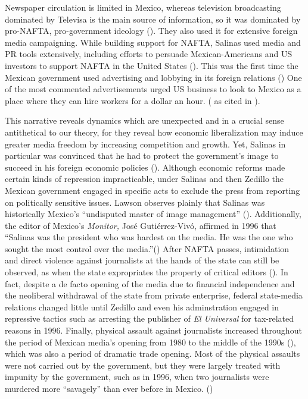 \documentclass[12pt]{report}
\begin{document}
Newspaper circulation is limited in Mexico, whereas television broadcasting
dominated by Televisa is the main source of information, so it was
dominated by pro-NAFTA, pro-government ideology (\citealt{Hellman:1993wa}).
They also used it for extensive foreign media campaigning. While building
support for NAFTA, Salinas used media and PR tools extensively, including
efforts to persuade Mexican-Americans and US investors to support
NAFTA in the United States (\citealt{Morris:2001iy}). This was the
first time the Mexican government used advertising and lobbying in
its foreign relations (\citealt{Chabat:1997wj}) One of the most commented
advertisements urged US business to look to Mexico as a place where
they can hire workers for a dollar an hour. (\citealt[105]{center1993trading}
as cited in \citealt[45]{Chabat:1997wj}).

This narrative reveals dynamics which are unexpected and in a crucial
sense antithetical to our theory, for they reveal how economic liberalization
may induce greater media freedom by increasing competition and growth.
Yet, Salinas in particular was convinced that he had to protect the
government's image to succeed in his foreign economic policies (\citealt[107]{Dominguez:2009wd}).
Although economic reforms made certain kinds of repression impracticable,
under Salinas and then Zedillo the Mexican government engaged in specific
acts to exclude the press from reporting on politically sensitive
issues. Lawson observes plainly that Salinas was historically Mexico's
``undisputed master of image management'' (\citealt[39]{lawson2002building}).
Additionally, the editor of Mexico's \emph{Monitor, }José Gutiérrez-Vivó,
affirmed in 1996 that ``Salinas was the president who was hardest
on the media. He was the one who sought the most control over the
media.''(\citealt[39]{lawson2002building}) After NAFTA passes, intimidation
and direct violence against journalists at the hands of the state
can still be observed, as when the state expropriates the property
of critical editors (\citealt{OrmeJr:1997da}). In fact, despite a
de facto opening of the media due to financial independence and the
neoliberal withdrawal of the state from private enterprise, federal
state-media relations changed little until Zedillo and even his adminstration
engaged in repressive tactics such as arresting the publisher of \emph{El
Universal} for tax-related reasons in 1996. Finally, physical assault
against journalists increased throughout the period of Mexican media's
opening from 1980 to the middle of the 1990s (\citealt[81]{lawson2002building}),
which was also a period of dramatic trade opening. Most of the physical
assaults were not carried out by the government, but they were largely
treated with impunity by the government, such as in 1996, when two
journalists were murdered more ``savagely'' than ever before in
Mexico. (\citealt{Anonymous:ex})
\end{document}
